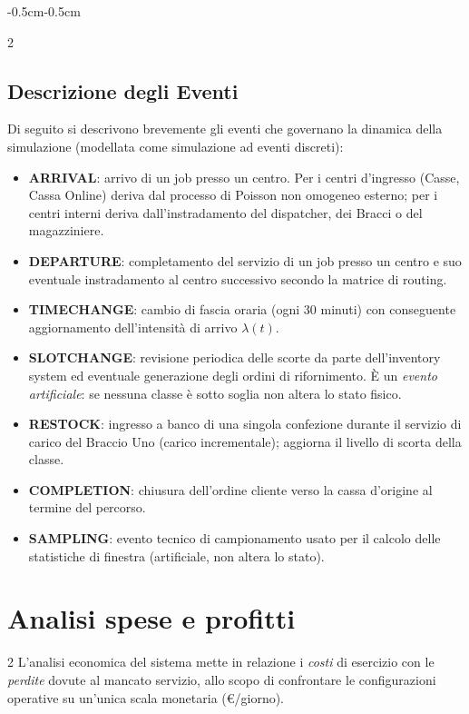 \documentclass{article}
\begin{document}
\begin{adjustwidth}{-0.5cm}{-0.5cm}
\begin{multicols}{2}
\subsection*{Descrizione degli Eventi}
Di seguito si descrivono brevemente gli eventi che governano la dinamica della simulazione
(modellata come simulazione ad eventi discreti):
\begin{itemize}
\item[\ding{112}] \textbf{ARRIVAL}: arrivo di un job presso un centro. Per i centri d'ingresso
(Casse, Cassa Online) deriva dal processo di Poisson non omogeneo esterno; per i centri interni
deriva dall'instradamento del dispatcher, dei Bracci o del magazziniere.
\item[\ding{112}] \textbf{DEPARTURE}: completamento del servizio di un job presso un centro e suo
eventuale instradamento al centro successivo secondo la matrice di routing.
\item[\ding{112}] \textbf{TIMECHANGE}: cambio di fascia oraria (ogni 30 minuti) con conseguente
aggiornamento dell'intensità di arrivo $\lambda(t)$.
\item[\ding{112}] \textbf{SLOTCHANGE}: revisione periodica delle scorte da parte dell'inventory
system ed eventuale generazione degli ordini di rifornimento. È un \emph{evento artificiale}:
se nessuna classe è sotto soglia non altera lo stato fisico.
\item[\ding{112}] \textbf{RESTOCK}: ingresso a banco di una singola confezione durante il servizio
di carico del Braccio Uno (carico incrementale); aggiorna il livello di scorta della classe.
\item[\ding{112}] \textbf{COMPLETION}: chiusura dell'ordine cliente verso la cassa d'origine al
termine del percorso.
\item[\ding{112}] \textbf{SAMPLING}: evento tecnico di campionamento usato per il calcolo delle
statistiche di finestra (artificiale, non altera lo stato).
\end{itemize}
\end{multicols}

\section*{Analisi spese e profitti}
\begin{multicols}{2}
L'analisi economica del sistema mette in relazione i \emph{costi} di esercizio con le
\emph{perdite} dovute al mancato servizio, allo scopo di confrontare le configurazioni operative
su un'unica scala monetaria (\euro/giorno).


\end{multicols}
\end{adjustwidth}
\end{document}
